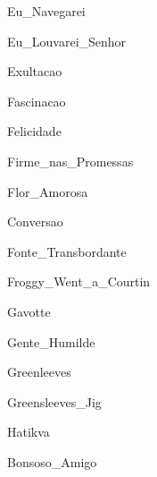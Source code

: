 \documentclass{article}
\begin{document}

{Eu_Navegarei}


{Eu_Louvarei_Senhor}


{Exultacao}


{Fascinacao}


{Felicidade}


{Firme_nas_Promessas}


{Flor_Amorosa}


{Conversao}


{Fonte_Transbordante}


{Froggy_Went_a_Courtin}


{Gavotte}


{Gente_Humilde}


{Greenleeves}


{Greensleeves_Jig}


{Hatikva}

    
{Bonsoso_Amigo}
\end{document}
